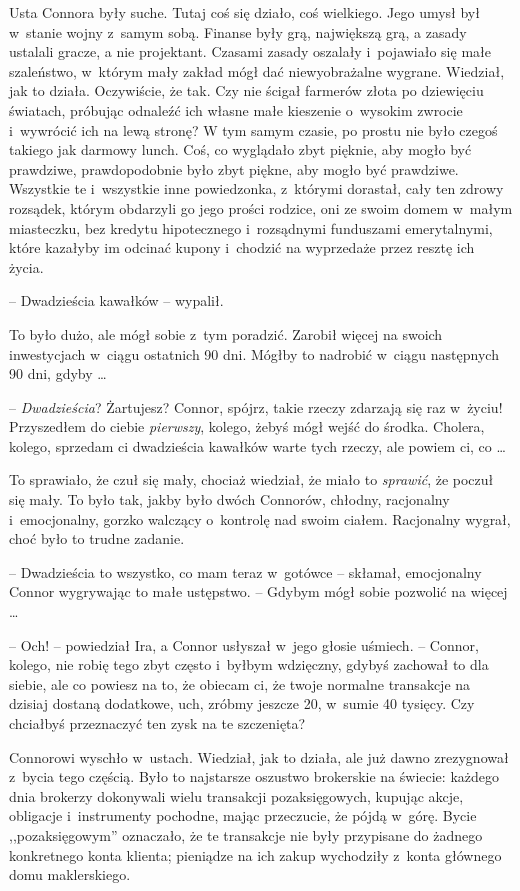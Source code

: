 \documentclass[oneside,polish,11pt,rmheadings]{mwbk}
\begin{document}
Usta Connora były suche. Tutaj coś się działo, coś wielkiego. Jego umysł był w~stanie wojny z~samym sobą. Finanse były grą, największą grą, a zasady ustalali gracze, a nie projektant. Czasami zasady oszalały i~pojawiało się małe szaleństwo, w~którym mały zakład mógł dać niewyobrażalne wygrane. Wiedział, jak to działa. Oczywiście, że tak. Czy nie ścigał farmerów złota po dziewięciu światach, próbując odnaleźć ich własne małe kieszenie o~wysokim zwrocie i~wywrócić ich na lewą stronę? W tym samym czasie, po prostu nie było czegoś takiego jak darmowy lunch. Coś, co wyglądało zbyt pięknie, aby mogło być prawdziwe, prawdopodobnie było zbyt piękne, aby mogło być prawdziwe. Wszystkie te i~wszystkie inne powiedzonka, z~którymi dorastał, cały ten zdrowy rozsądek, którym obdarzyli go jego prości rodzice, oni ze swoim domem w~małym miasteczku, bez kredytu hipotecznego i~rozsądnymi funduszami emerytalnymi, które kazałyby im odcinać kupony i~chodzić na wyprzedaże przez resztę ich życia.

-- Dwadzieścia kawałków -- wypalił. 

To było dużo, ale mógł sobie z~tym poradzić. Zarobił więcej na swoich inwestycjach w~ciągu ostatnich 90 dni. Mógłby to nadrobić w~ciągu następnych 90 dni, gdyby \ldots 

-- \textit{Dwadzieścia}? Żartujesz? Connor, spójrz, takie rzeczy zdarzają się raz w~życiu! Przyszedłem do ciebie \textit{pierwszy}, kolego, żebyś mógł wejść do środka. Cholera, kolego, sprzedam ci dwadzieścia kawałków warte tych rzeczy, ale powiem ci, co \ldots 

To sprawiało, że czuł się mały, chociaż wiedział, że miało to \textit{sprawić}, że poczuł się mały. To było tak, jakby było dwóch Connorów, chłodny, racjonalny i~emocjonalny, gorzko walczący o~kontrolę nad swoim ciałem. Racjonalny wygrał, choć było to trudne zadanie.

-- Dwadzieścia to wszystko, co mam teraz w~gotówce -- skłamał, emocjonalny Connor wygrywając to małe ustępstwo. -- Gdybym mógł sobie pozwolić na więcej \ldots  

-- Och! -- powiedział Ira, a Connor usłyszał w~jego głosie uśmiech. -- Connor, kolego, nie robię tego zbyt często i~byłbym wdzięczny, gdybyś zachował to dla siebie, ale co powiesz na to, że obiecam ci, że twoje normalne transakcje na dzisiaj dostaną dodatkowe, uch, zróbmy jeszcze 20, w~sumie 40 tysięcy. Czy chciałbyś przeznaczyć ten zysk na te szczenięta?

Connorowi wyschło w~ustach. Wiedział, jak to działa, ale już dawno zrezygnował z~bycia tego częścią. Było to najstarsze oszustwo brokerskie na świecie: każdego dnia brokerzy dokonywali wielu transakcji pozaksięgowych, kupując akcje, obligacje i~instrumenty pochodne, mając przeczucie, że pójdą w~górę. Bycie ,,pozaksięgowym'' oznaczało, że te transakcje nie były przypisane do żadnego konkretnego konta klienta; pieniądze na ich zakup wychodziły z~konta głównego domu maklerskiego.
\end{document}
